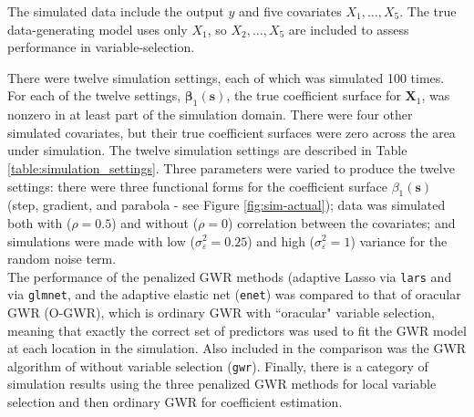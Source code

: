 \documentclass[authoryear, review, 11pt]{elsarticle}
\begin{document}
	The simulated data include the output $y$ and five covariates $X_1, \dots, X_5$. The true data-generating model uses only $X_1$, so $X_2, \dots, X_5$ are included to assess performance in variable-selection.
	
	There were twelve simulation settings, each of which was simulated 100 times. For each of the twelve settings, $\bm{\beta}_1(\bm{s})$, the true coefficient surface for $\bm{X}_1$, was nonzero in at least part of the simulation domain. There were four other simulated covariates, but their true coefficient surfaces were zero across the area under simulation. The twelve simulation settings are described in Table \ref{table:simulation_settings}. Three parameters were varied to produce the twelve settings: there were three functional forms for the coefficient surface $\beta_1(\bm{s})$ (step, gradient, and parabola - see Figure \ref{fig:sim-actual}); data was simulated both with ($\rho = 0.5$) and without ($\rho = 0$) correlation between the covariates; and simulations were made with low ($\sigma_\varepsilon^2 = 0.25$) and high ($\sigma_\varepsilon^2 = 1$) variance for the random noise term.\\
	
	The performance of the penalized GWR methods (adaptive Lasso via \verb!lars! and via \verb!glmnet!, and the adaptive elastic net (\verb!enet!) was compared to that of oracular GWR (O-GWR), which is ordinary GWR with ``oracular" variable selection, meaning that exactly the correct set of predictors was used to fit the GWR model at each location in the simulation. Also included in the comparison was the GWR algorithm of \cite{Fotheringham:2002} without variable selection (\verb!gwr!). Finally, there is a category of simulation results using the three penalized GWR methods for local variable selection and then ordinary GWR for coefficient estimation.\\
	
\end{document}
